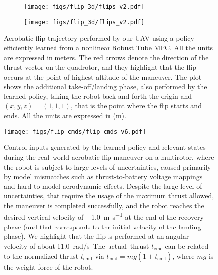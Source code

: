 \begin{figure}
    \centering
    \begin{subfigure}{.5\columnwidth}
      \centering
      \texttt{[image: figs/flip\_3d/flips\_v2.pdf]}
    \end{subfigure}%
    \begin{subfigure}{.5\columnwidth}
      \centering
      \texttt{[image: figs/flip\_3d/flips\_v2.pdf]}
    \end{subfigure}%
    \caption{Acrobatic flip trajectory performed by our UAV using a policy efficiently learned from a nonlinear Robust Tube MPC. All the units are expressed in meters. The red arrows denote the direction of the thrust vector on the quadrotor, and they highlight that the flip occurs at the point of highest altitude of the maneuver. The plot shows the additional take-off/landing phase, also performed by the learned policy, taking the robot back and forth the origin and $(x, y, z) = (1, 1, 1)$, that is the point where the flip starts and ends. All the units are expressed in (m). 
    } 
    \label{fig:rtnmc_experiment_state_traj}
    \vspace{-3ex}
\end{figure}

\begin{figure}
    \centering
    \texttt{[image: figs/flip\_cmds/flip\_cmds\_v6.pdf]}
    \caption{
    Control inputs generated by the learned policy and relevant states during the real--world acrobatic flip maneuver on a multirotor, where the robot is subject to large levels of uncertainties, caused primarily by model mismatches such as thrust-to-battery voltage mappings and hard-to-model aerodynamic effects. 
    Despite the large level of uncertainties, that require the usage of the maximum thrust allowed, the maneuver is completed successfully, and the robot reaches the desired vertical velocity of \SI{-1.0}{\m \per \s} at the end of the recovery phase (and that corresponds to the initial velocity of the landing phase). 
    We highlight that the flip is performed at an angular velocity of about \SI{11.0}rad/s. 
    The actual thrust $t_\text{cmd}$ can be related to the 
    normalized thrust $\bar{t}_\text{cmd}$ via  
    $t_\text{cmd} = m g (1 + \bar{t}_\text{cmd})$,
    where $ m g $ is the weight force of the robot.}
    \label{fig:rtnmc_experiment_actuation}
\end{figure}
\vspace{-7pt}